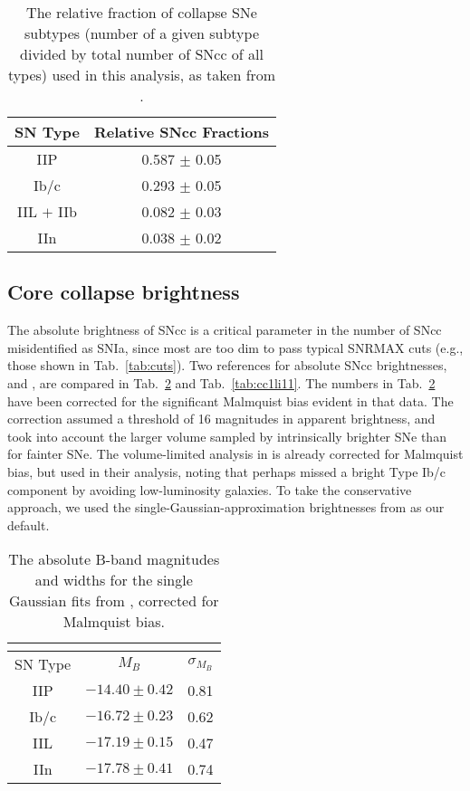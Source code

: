 \documentclass[preprint2]{aastex}    %
\begin{document}
\begin{table}[h]
\centering%
\begin{tabular}
[c]{|c|c|}\hline
SN Type & Relative SNcc Fractions\\
\hline
IIP & 0.587 $\pm$ 0.05 \\
Ib/c & 0.293 $\pm$ 0.05 \\
IIL $+$ IIb & 0.082 $\pm$ 0.03 \\
IIn & 0.038 $\pm$ 0.02 \\
\hline
\end{tabular}
\caption{The relative fraction of collapse SNe subtypes (number of a given subtype divided by total number of SNcc of all types) used in this analysis, 
as taken from \cite{sma09}.}
\label{tab:ccfrac}%
\end{table}

\subsection{Core collapse brightness}
The absolute brightness of SNcc is a critical parameter in
the number of SNcc misidentified as SNIa,  since most are 
too dim to pass typical SNRMAX cuts (e.g., those shown in Tab.~\ref{tab:cuts}).  Two references for absolute 
SNcc brightnesses, \cite{ric02} and 
\cite{li11}, are compared in Tab.~\ref{tab:cc1rich} 
and Tab.~\ref{tab:cc1li11}. The numbers in 
Tab.~\ref{tab:cc1rich} have been corrected 
for the significant Malmquist 
bias evident in that data.  The correction 
assumed a threshold of 16 magnitudes in apparent 
brightness, and took into account 
the larger volume sampled by intrinsically brighter SNe than
for fainter SNe.  The volume-limited analysis 
in \cite{li11} is already corrected for Malmquist bias, 
but \cite{con11} used \cite{ric02} in their analysis, 
noting that \cite{li11} perhaps missed a bright 
Type Ib/c component by avoiding low-luminosity galaxies.  To take 
the conservative approach, we used the single-Gaussian-approximation 
brightnesses from \cite{ric02} as our 
default.

\begin{table}[h]
\centering%
\begin{tabular}
[c]{|c|c|c|}\hline
\cite{ric02} & &\\\hline
SN Type & $M_{B}$ & $\sigma_{M_{B}}$\\
\hline
IIP & $-14.40\pm 0.42$ & 0.81 \\
Ib/c & $-16.72\pm 0.23$ & 0.62 \\
IIL & $-17.19\pm 0.15$& 0.47 \\
IIn & $-17.78\pm 0.41$ & 0.74 \\
\hline
\end{tabular}
\caption{The absolute B-band magnitudes and widths for the single Gaussian fits
from \cite{ric02}, corrected for Malmquist bias.}
\label{tab:cc1rich}%
\end{table}
\end{document}
